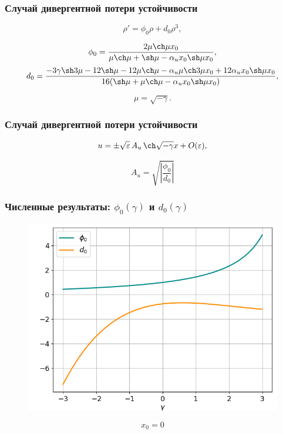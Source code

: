 \documentclass[fullscreen=true, unicode, bookmarks=false]{beamer}
\begin{document}
\begin{frame}
\frametitle{ Случай дивергентной потери устойчивости }

\begin{equation}
	\rho' = \phi_0 \rho + d_0 \rho^3,
\end{equation}

\bigskip
\pause

$$ \phi_0 = \frac{ 2 \mu \ch \mu x_0 }{ \mu \ch \mu +\sh \mu - \alpha_u x_0 \sh \mu x_0 }, $$
$$ d_0 = \frac{ -3\gamma \sh 3\mu - 12 \sh \mu - 12 \mu \ch \mu - \alpha_u \mu \ch 3\mu x_0 + 12 \alpha_u x_0 \sh \mu x_0 }{ 16( \sh \mu + \mu \ch \mu - \alpha_u x_0 \sh \mu x_0 ) }, $$

$$ \mu = \sqrt{-\gamma}. $$

\end{frame}

\begin{frame}
\frametitle{ Случай дивергентной потери устойчивости }

\begin{equation}
	u = \pm \sqrt{\varepsilon} \, A_u \, \ch \sqrt{-\gamma} x + O(\varepsilon),
\end{equation}

\bigskip

$$ A_u = \sqrt{ \left| \frac{\phi_0}{d_0} \right| } $$

\end{frame}

\begin{frame}
\frametitle{ Численные результаты: $ \phi_0(\gamma) $ и $ d_0(\gamma) $ }

\begin{figure} 
\includegraphics[scale=0.55]{divergent_phi0d0_0.png}  
\end{figure}

$$ x_0 = 0 $$

\end{frame}
\end{document}
